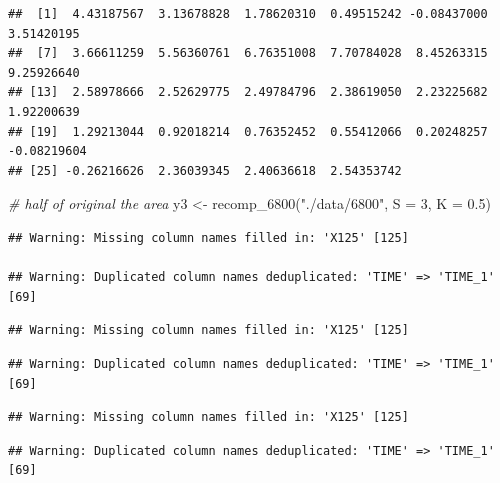 \documentclass[
]{krantz}
\makeatletter
\newenvironment{Shaded}{\begin{snugshade}}{\end{snugshade}}
\newcommand{\AttributeTok}[1]{\textcolor[rgb]{0.77,0.63,0.00}{#1}}
\newcommand{\CommentTok}[1]{\textcolor[rgb]{0.56,0.35,0.01}{\textit{#1}}}
\newcommand{\DecValTok}[1]{\textcolor[rgb]{0.00,0.00,0.81}{#1}}
\newcommand{\FloatTok}[1]{\textcolor[rgb]{0.00,0.00,0.81}{#1}}
\newcommand{\FunctionTok}[1]{\textcolor[rgb]{0.00,0.00,0.00}{#1}}
\newcommand{\NormalTok}[1]{#1}
\newcommand{\OtherTok}[1]{\textcolor[rgb]{0.56,0.35,0.01}{#1}}
\newcommand{\SpecialCharTok}[1]{\textcolor[rgb]{0.00,0.00,0.00}{#1}}
\newcommand{\StringTok}[1]{\textcolor[rgb]{0.31,0.60,0.02}{#1}}
\newenvironment{kframe}{%
\medskip{}
\setlength{\fboxsep}{.8em}
 \def\at@end@of@kframe{}%
 \ifinner\ifhmode%
  \def\at@end@of@kframe{\end{minipage}}%
  \begin{minipage}{\columnwidth}%
 \fi\fi%
 \def\FrameCommand##1{\hskip\@totalleftmargin \hskip-\fboxsep
 \colorbox{shadecolor}{##1}\hskip-\fboxsep
     \hskip-\linewidth \hskip-\@totalleftmargin \hskip\columnwidth}%
 \MakeFramed {\advance\hsize-\width
   \@totalleftmargin\z@ \linewidth\hsize
   \@setminipage}}%
 {\par\unskip\endMakeFramed%
 \at@end@of@kframe}
\renewenvironment{Shaded}{\begin{kframe}}{\end{kframe}}
\makeatother
\begin{document}
\begin{Shaded}
\end{Shaded}

\begin{verbatim}
##  [1]  4.43187567  3.13678828  1.78620310  0.49515242 -0.08437000  3.51420195
##  [7]  3.66611259  5.56360761  6.76351008  7.70784028  8.45263315  9.25926640
## [13]  2.58978666  2.52629775  2.49784796  2.38619050  2.23225682  1.92200639
## [19]  1.29213044  0.92018214  0.76352452  0.55412066  0.20248257 -0.08219604
## [25] -0.26216626  2.36039345  2.40636618  2.54353742
\end{verbatim}

\begin{Shaded}
\begin{Highlighting}[]
\CommentTok{\# half of original the area}
\NormalTok{y3 }\OtherTok{\textless{}{-}} \FunctionTok{recomp\_6800}\NormalTok{(}\StringTok{"./data/6800"}\NormalTok{, }\AttributeTok{S =} \DecValTok{3}\NormalTok{, }\AttributeTok{K =} \FloatTok{0.5}\NormalTok{)}
\end{Highlighting}
\end{Shaded}

\begin{verbatim}
## Warning: Missing column names filled in: 'X125' [125]

## Warning: Duplicated column names deduplicated: 'TIME' => 'TIME_1' [69]
\end{verbatim}

\begin{verbatim}
## Warning: Missing column names filled in: 'X125' [125]
\end{verbatim}

\begin{verbatim}
## Warning: Duplicated column names deduplicated: 'TIME' => 'TIME_1' [69]
\end{verbatim}

\begin{verbatim}
## Warning: Missing column names filled in: 'X125' [125]
\end{verbatim}

\begin{verbatim}
## Warning: Duplicated column names deduplicated: 'TIME' => 'TIME_1' [69]
\end{verbatim}
\end{document}
